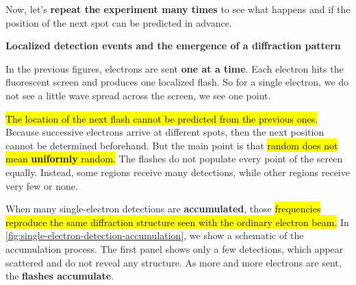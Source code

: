 \noindent
Now, let's \textbf{repeat the experiment many times} to see what happens and if the position of the next spot can be predicted in advance.

\newpage

\begin{flushleft}
    \textcolor{Green3}{ \textbf{Localized detection events and the emergence of a diffraction pattern}}
\end{flushleft}
In the previous figures, electrons are sent \textbf{one at a time}. Each electron hits the fluorescent screen and produces one localized flash. So for a single electron, we do not see a little wave spread across the screen, we see one point.

\highspace
\hl{The location of the next flash cannot be predicted from the previous ones.} Because successive electrons arrive at different spots, then the next position cannot be determined beforehand. But the main point is that \hl{random does not mean \textbf{uniformly} random.} The flashes do not populate every point of the screen equally. Instead, some regions receive many detections, while other regions receive very few or none.

\highspace
When many single-electron detections are \textbf{accumulated}, those \hl{frequencies reproduce the same diffraction structure seen with the ordinary electron beam.} In \autoref{fig:single-electron-detection-accumulation}, we show a schematic of the accumulation process. The first panel shows only a few detections, which appear scattered and do not reveal any structure. As more and more electrons are sent, the \textbf{flashes accumulate}.

